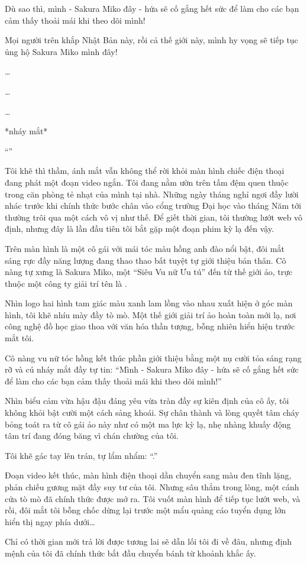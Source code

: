 \documentclass[../main.tex]{subfiles}
\begin{document}
Dù sao thì, mình - Sakura Miko đây - hứa sẽ cố gắng hết sức để làm cho các bạn cảm thấy thoải mái khi theo dõi mình!

Mọi người trên khắp Nhật Bản này, rồi cả thế giới này, mình hy vọng sẽ tiếp tục ủng hộ Sakura Miko mình đây!

\dots

\dots

\dots


*nháy mắt*


``''

Tôi khẽ thì thầm, ánh mắt vẫn không thể rời khỏi màn hình chiếc điện thoại đang phát một đoạn video ngắn. Tôi đang nằm ườn trên tấm đệm quen thuộc trong căn phòng tẻ nhạt của mình tại nhà. Những ngày tháng nghỉ ngơi đầy lười nhác trước khi chính thức bước chân vào cổng trường Đại học vào tháng Năm tới thường trôi qua một cách vô vị như thế. Để giết thời gian, tôi thường lướt web vô định, nhưng đây là lần đầu tiên tôi bắt gặp một đoạn phim kỳ lạ đến vậy.

Trên màn hình là một cô gái với mái tóc màu hồng anh đào nổi bật, đôi mắt sáng rực đầy năng lượng đang thao thao bất tuyệt tự giới thiệu bản thân. Cô nàng tự xưng là Sakura Miko, một ``Siêu Vu nữ Ưu tú'' đến từ thế giới ảo, trực thuộc một công ty giải trí tên là \hll.

Nhìn logo hai hình tam giác màu xanh lam lồng vào nhau xuất hiện ở góc màn hình, tôi khẽ nhíu mày đầy tò mò. Một thế giới giải trí ảo hoàn toàn mới lạ, nơi công nghệ đồ học giao thoa với văn hóa thần tượng, bỗng nhiên hiển hiện trước mắt tôi.

Cô nàng vu nữ tóc hồng kết thúc phần giới thiệu bằng một nụ cười tỏa sáng rạng rỡ và cú nháy mắt đầy tự tin: ``Mình - Sakura Miko đây - hứa sẽ cố gắng hết sức để làm cho các bạn cảm thấy thoải mái khi theo dõi mình!''

Nhìn biểu cảm vừa hậu đậu đáng yêu vừa tràn đầy sự kiên định của cô ấy, tôi không khỏi bật cười một cách sảng khoái. Sự chân thành và lòng quyết tâm cháy bỏng toát ra từ cô gái ảo này như có một ma lực kỳ lạ, nhẹ nhàng khuấy động tâm trí đang đóng băng vì chán chường của tôi.

Tôi khẽ gác tay lên trán, tự lẩm nhẩm: ``.''

Đoạn video kết thúc, màn hình điện thoại dần chuyển sang màu đen tĩnh lặng, phản chiếu gương mặt đầy suy tư của tôi. Nhưng sâu thẳm trong lòng, một cánh cửa tò mò đã chính thức được mở ra. Tôi vuốt màn hình để tiếp tục lướt web, và rồi, đôi mắt tôi bỗng chốc dừng lại trước một mẩu quảng cáo tuyển dụng lớn hiển thị ngay phía dưới\dots

Chỉ có thời gian mới trả lời được tương lai sẽ dẫn lối tôi đi về đâu, nhưng định mệnh của tôi đã chính thức bắt đầu chuyển bánh từ khoảnh khắc ấy.
\end{document}
